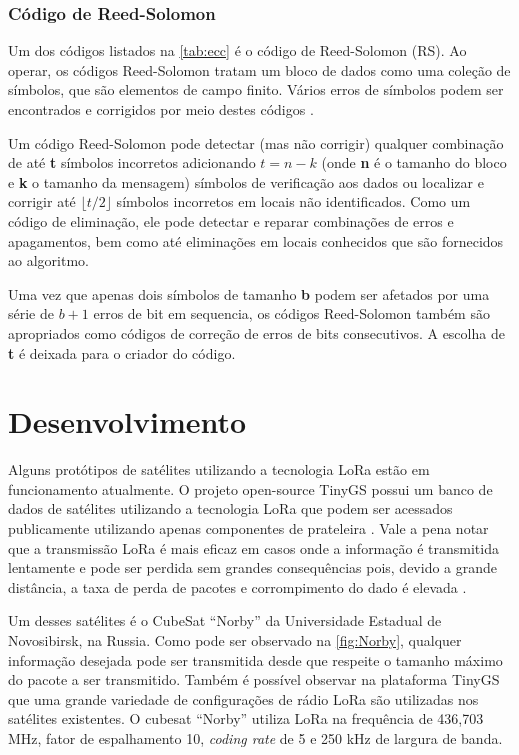 \documentclass[
	12pt,				%
	openright,			%
	twoside,			%
	a4paper,			%
	english,			%
	french,				%
	spanish,			%
	brazil				%
	]{abntex2}
\newcommand{\quotes}[1]{``#1''}
\begin{document}
\subsection{Código de Reed-Solomon}

Um dos códigos listados na \autoref{tab:ecc} é o código de Reed-Solomon (RS). Ao operar, os códigos Reed-Solomon tratam um bloco de dados como uma coleção de símbolos, que são elementos de campo finito. Vários erros de símbolos podem ser encontrados e corrigidos por meio destes códigos \cite{RS_1960}.

Um código Reed-Solomon pode detectar (mas não corrigir) qualquer combinação de até \textbf{t} símbolos incorretos adicionando $t = n - k$ (onde \textbf{n} é o tamanho do bloco e \textbf{k} o tamanho da mensagem) símbolos de verificação aos dados ou localizar e corrigir até $\lfloor t/2 \rfloor$ símbolos incorretos em locais não identificados. Como um código de eliminação, ele pode detectar e reparar combinações de erros e apagamentos, bem como até eliminações em locais conhecidos que são fornecidos ao algoritmo.

Uma vez que apenas dois símbolos de tamanho \textbf{b} podem ser afetados por uma série de $b + 1$ erros de bit em sequencia, os códigos Reed-Solomon também são apropriados como códigos de correção de erros de bits consecutivos. A escolha de \textbf{t} é deixada para o criador do código.

\chapter{Desenvolvimento}

Alguns protótipos de satélites utilizando a tecnologia LoRa estão em funcionamento atualmente. O projeto open-source TinyGS possui um banco de dados de satélites utilizando a tecnologia LoRa que podem ser acessados publicamente utilizando apenas componentes de prateleira \cite{tinygs_2022}. Vale a pena notar que a transmissão LoRa é mais eficaz em casos onde a informação é transmitida lentamente e pode ser perdida sem grandes consequências pois, devido a grande distância, a taxa de perda de pacotes e corrompimento do dado é elevada \cite{yazdani_2021}.

Um desses satélites é o CubeSat \quotes{Norby} da Universidade Estadual de Novosibirsk, na Russia. Como pode ser observado na \autoref{fig:Norby}, qualquer informação desejada pode ser transmitida desde que respeite o tamanho máximo do pacote a ser transmitido. Também é possível observar na plataforma TinyGS que uma grande variedade de configurações de rádio LoRa são utilizadas nos satélites existentes. O cubesat \quotes{Norby} utiliza LoRa na frequência de 436,703 MHz, fator de espalhamento 10, \emph{coding rate} de 5 e 250 kHz de largura de banda.
\end{document}
